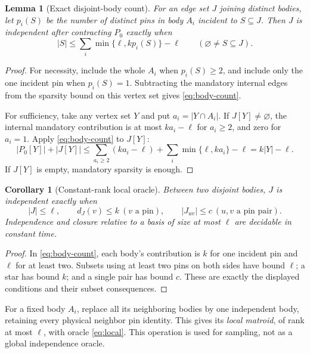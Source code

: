 \documentclass[11pt,a4paper]{article}
\newtheorem{lemma}[theorem]{Lemma}
\newtheorem{corollary}[theorem]{Corollary}
\theoremstyle{definition}
\theoremstyle{remark}
\begin{document}
\begin{lemma}[Exact disjoint-body count]\label{lem:body-count}
For an edge set $J$ joining distinct bodies, let $p_i(S)$
be the number of distinct pins in body $A_i$ incident to
$S\subseteq J$. Then $J$ is independent after contracting
$P_0$ exactly when
\begin{equation}\label{eq:body-count}
 |S|\leq\sum_i\min\{\ell,kp_i(S)\}-\ell
 \qquad(\varnothing\ne S\subseteq J).
\end{equation}
\end{lemma}
\begin{proof}
For necessity, include the whole $A_i$ when $p_i(S)\geq2$,
and include only the one incident pin when $p_i(S)=1$.
Subtracting the mandatory internal edges from the sparsity
bound on this vertex set gives \eqref{eq:body-count}.

For sufficiency, take any vertex set $Y$ and put
$a_i=|Y\cap A_i|$. If $J[Y]\ne\varnothing$, the internal
mandatory contribution is at most $ka_i-\ell$ for $a_i\geq2$,
and zero for $a_i=1$. Apply \eqref{eq:body-count} to $J[Y]$:
\[
 |P_0[Y]|+|J[Y]|
 \leq \sum_{a_i\geq2}(ka_i-\ell)
      +\sum_i\min\{\ell,ka_i\}-\ell
 =k|Y|-\ell.
\]
If $J[Y]$ is empty, mandatory sparsity is enough.
\end{proof}

\begin{corollary}[Constant-rank local oracle]\label{cor:local}
Between two disjoint bodies, $J$ is independent exactly when
\begin{equation}\label{eq:local}
 |J|\leq\ell,\qquad d_J(v)\leq k\ (v\text{ a pin}),\qquad
 |J_{uv}|\leq c\ (u,v\text{ a pin pair}).
\end{equation}
Independence and closure relative to a basis of size at
most $\ell$ are decidable in constant time.
\end{corollary}
\begin{proof}
In \eqref{eq:body-count}, each body's contribution is $k$
for one incident pin and $\ell$ for at least two.
Subsets using at least two pins on both sides have bound
$\ell$; a star has bound $k$; and a single pair has bound
$c$. These are exactly the displayed conditions and their
subset consequences.
\end{proof}

For a fixed body $A_i$, replace all its neighboring bodies
by one independent body, retaining every physical neighbor
pin identity. This gives its \emph{local matroid}, of rank
at most $\ell$, with oracle \eqref{eq:local}.
This operation is used for sampling, not as a global
independence oracle.
\end{document}
